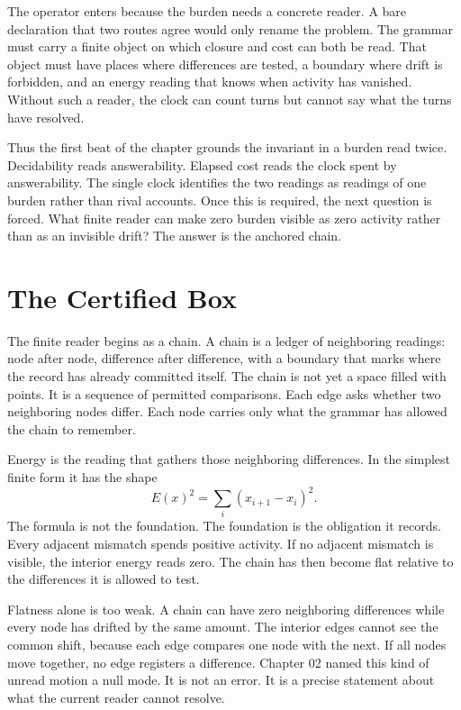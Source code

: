 The operator enters because the burden needs a concrete reader. A bare
declaration that two routes agree would only rename the problem. The grammar
must carry a finite object on which closure and cost can both be read. That
object must have places where differences are tested, a boundary where drift
is forbidden, and an energy reading that knows when activity has vanished.
Without such a reader, the clock can count turns but cannot say what the
turns have resolved.

Thus the first beat of the chapter grounds the invariant in a burden read
twice. Decidability reads answerability. Elapsed cost reads the clock spent
by answerability. The single clock identifies the two readings as readings
of one burden rather than rival accounts. Once this is required, the next
question is forced. What finite reader can make zero burden visible as zero
activity rather than as an invisible drift? The answer is the anchored
chain.

\section{The Certified Box}

The finite reader begins as a chain. A chain is a ledger of neighboring
readings: node after node, difference after difference, with a boundary that
marks where the record has already committed itself. The chain is not yet a
space filled with points. It is a sequence of permitted comparisons. Each
edge asks whether two neighboring nodes differ. Each node carries only what
the grammar has allowed the chain to remember.

Energy is the reading that gathers those neighboring differences. In the
simplest finite form it has the shape
\[
  E(x)^2 = \sum_i (x_{i+1}-x_i)^2 .
\]
The formula is not the foundation. The foundation is the obligation it
records. Every adjacent mismatch spends positive activity. If no adjacent
mismatch is visible, the interior energy reads zero. The chain has then
become flat relative to the differences it is allowed to test.

Flatness alone is too weak. A chain can have zero neighboring differences
while every node has drifted by the same amount. The interior edges cannot
see the common shift, because each edge compares one node with the next. If
all nodes move together, no edge registers a difference. Chapter 02 named
this kind of unread motion a null mode. It is not an error. It is a precise
statement about what the current reader cannot resolve.

